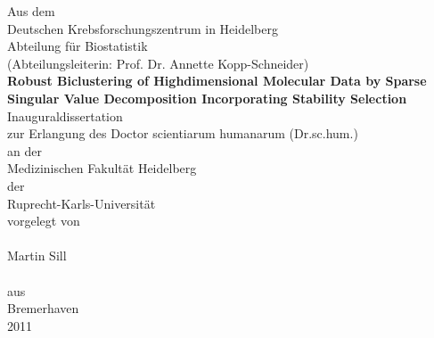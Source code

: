 \begin{titlepage}
\centering
\vspace{3cm}
Aus dem \\
Deutschen Krebsforschungszentrum in Heidelberg\\
Abteilung f\"ur Biostatistik\\
(Abteilungsleiterin: Prof. Dr. Annette Kopp-Schneider)\\
\vspace{4cm}
{\large\bf Robust Biclustering of Highdimensional Molecular Data by Sparse Singular Value Decomposition Incorporating Stability Selection}\\
\vspace{4cm}
Inauguraldissertation\\
zur Erlangung des Doctor scientiarum humanarum (Dr.sc.hum.)\\
an der\\
Medizinischen Fakult\"at Heidelberg\\
der\\
Ruprecht-Karls-Universit\"at\\
\vspace{3cm}
vorgelegt von\\\hspace{0.25pt}\\
Martin Sill\\\hspace{1pt}\\
aus\\
Bremerhaven\\
2011\\
\end{titlepage}
